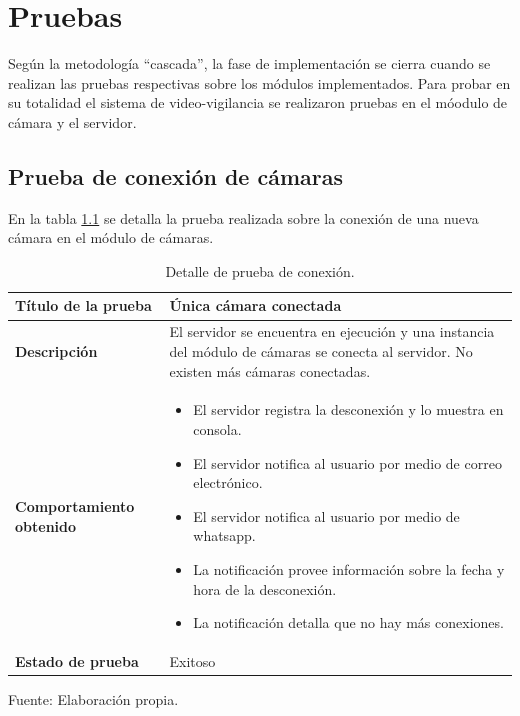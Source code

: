 \chapter{Pruebas}

Según la metodología ``cascada'', la fase de implementación se cierra cuando se realizan las pruebas respectivas sobre los módulos implementados. Para probar en su totalidad el sistema de video-vigilancia se realizaron pruebas en el móodulo de cámara y el servidor.\\

\section{Prueba de conexión de cámaras}
En la tabla \ref{con_modulo_cameras} se detalla la prueba realizada sobre la conexión de una nueva cámara en el módulo de cámaras.

\begin{table}[H]
    \caption{Detalle de prueba de conexión.}
    \label{con_modulo_cameras}
    \begin{center}
        \begin{tabular}{|>{\centering}p{}|m{}<{\centering}|} 
            \hline
            \textbf{Título de la prueba} & \textbf{Única cámara conectada} \\
            \hline
            \textbf{Descripción} & El servidor se encuentra en ejecución y una instancia del módulo de cámaras se conecta al servidor. No existen más cámaras conectadas.\\
            \hline
            \textbf{Comportamiento obtenido} & 
            \begin{itemize}
                \item El servidor registra la desconexión y lo muestra en consola.
                \item El servidor notifica al usuario por medio de correo electrónico.
                \item El servidor notifica al usuario por medio de whatsapp.
                \item La notificación provee información sobre la fecha y hora de la desconexión.
                \item La notificación detalla que no hay más conexiones.
            \end{itemize} \\ 
            \hline
            \textbf{Estado de prueba} & Exitoso \\
            \hline
        \end{tabular}
        \begin{center}
            Fuente: Elaboración propia.
        \end{center}
    \end{center}
\end{table}

